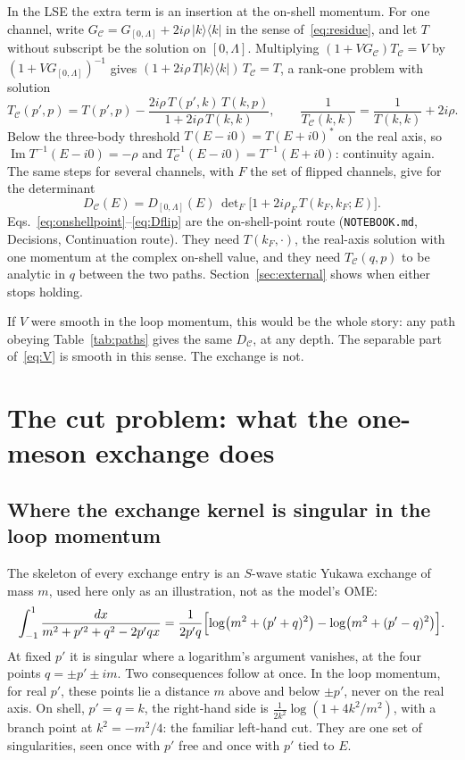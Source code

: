 \documentclass[11pt]{article}
\newcommand{\file}[1]{\nolinkurl{#1}}
\begin{document}
In the LSE the extra term is an insertion at the on-shell momentum. For one channel, write $G_{\mathcal C}=G_{[0,\Lambda]}+2i\rho\,|k\rangle\langle k|$ in the sense of~\eqref{eq:residue}, and let $T$ without subscript be the solution on $[0,\Lambda]$. Multiplying $(1+VG_{\mathcal C})T_{\mathcal C}=V$ by $(1+VG_{[0,\Lambda]})^{-1}$ gives $(1+2i\rho\,T|k\rangle\langle k|)\,T_{\mathcal C}=T$, a rank-one problem with solution
\begin{equation}\label{eq:onshellpoint}
T_{\mathcal C}(p',p)=T(p',p)-\frac{2i\rho\,T(p',k)\,T(k,p)}{1+2i\rho\,T(k,k)},\qquad
\frac{1}{T_{\mathcal C}(k,k)}=\frac{1}{T(k,k)}+2i\rho .
\end{equation}
Below the three-body threshold $T(E-i0)=T(E+i0)^*$ on the real axis, so $\operatorname{Im}T^{-1}(E-i0)=-\rho$ and $T_{\mathcal C}^{-1}(E-i0)=T^{-1}(E+i0)$: continuity again. The same steps for several channels, with $F$ the set of flipped channels, give for the determinant
\begin{equation}\label{eq:Dflip}
D_{\mathcal C}(E)=D_{[0,\Lambda]}(E)\,\det\nolimits_F\bigl[1+2i\rho_F\,T(k_F,k_F;E)\bigr].
\end{equation}
Eqs.~\eqref{eq:onshellpoint}--\eqref{eq:Dflip} are the on-shell-point route (\file{NOTEBOOK.md}, Decisions, Continuation route). They need $T(k_F,\cdot)$, the real-axis solution with one momentum at the complex on-shell value, and they need $T_{\mathcal C}(q,p)$ to be analytic in $q$ between the two paths. Section~\ref{sec:external} shows when either stops holding.

If $V$ were smooth in the loop momentum, this would be the whole story: any path obeying Table~\ref{tab:paths} gives the same $D_{\mathcal C}$, at any depth. The separable part of~\eqref{eq:V} is smooth in this sense. The exchange is not.

\section{The cut problem: what the one-meson exchange does}\label{sec:cuts}

\subsection{Where the exchange kernel is singular in the loop momentum}\label{sec:kernel}

The skeleton of every exchange entry is an $S$-wave static Yukawa exchange of mass $m$, used here only as an illustration, not as the model's OME:
\begin{equation}\label{eq:yukawa}
\int_{-1}^{1}\frac{dx}{m^2+p'^2+q^2-2p'qx}=\frac{1}{2p'q}\Bigl[\log\bigl(m^2+(p'+q)^2\bigr)-\log\bigl(m^2+(p'-q)^2\bigr)\Bigr].
\end{equation}
At fixed $p'$ it is singular where a logarithm's argument vanishes, at the four points $q=\pm p'\pm im$. Two consequences follow at once. In the loop momentum, for real $p'$, these points lie a distance $m$ above and below $\pm p'$, never on the real axis. On shell, $p'=q=k$, the right-hand side is $\frac{1}{2k^2}\log(1+4k^2/m^2)$, with a branch point at $k^2=-m^2/4$: the familiar left-hand cut. They are one set of singularities, seen once with $p'$ free and once with $p'$ tied to $E$.
\end{document}
